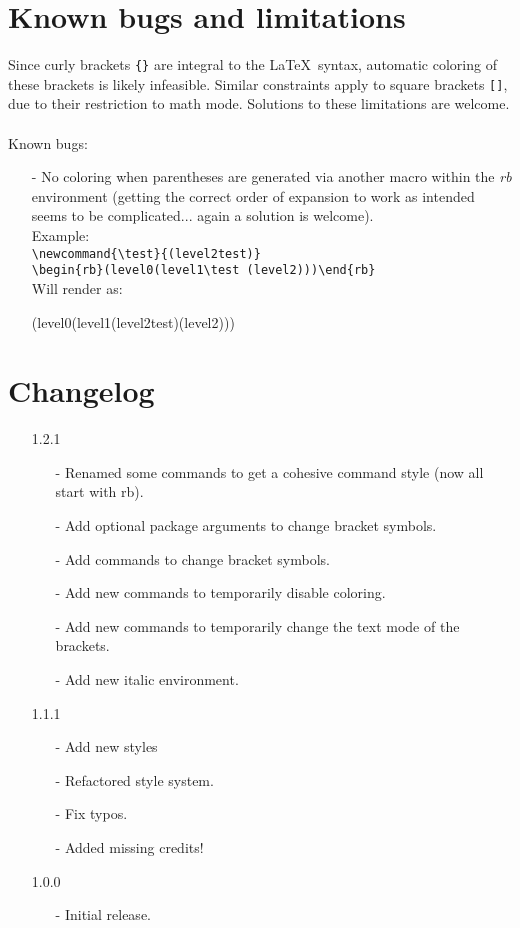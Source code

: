 \documentclass[10pt, a4paper]{article}
\begin{document}
	\section{Known bugs and limitations}
	Since curly brackets \verb={}= are integral to the \LaTeX\ syntax, automatic coloring of these brackets is likely infeasible. Similar constraints apply to square brackets \verb=[]=, due to their restriction to math mode. Solutions to these limitations are welcome.
	\\\ \\Known bugs:
	\begin{enumerate}
		\item[-] No coloring when parentheses are generated via another macro within the \textit{rb} environment (getting the correct order of expansion to work as intended seems to be complicated... again a solution is welcome). \\Example: 
		\\\verb=\newcommand{\test}{(level2test)}= 
		\\\verb=\begin{rb}(level0(level1\test (level2)))\end{rb}= 
		\\Will render as: \newcommand{\test}{(level2test)}
		\begin{rb}(level0(level1\test (level2)))\end{rb}  
	\end{enumerate}
	\section{Changelog}
	\begin{itemize}
		\item[1.2.1] 
		\begin{enumerate}
			\item[-] Renamed some commands to get a cohesive command style (now all start with rb).
			\item[-] Add optional package arguments to change bracket symbols.
			\item[-] Add commands to change bracket symbols.
			\item[-] Add new commands to temporarily disable coloring.
			\item[-] Add new commands to temporarily change the text mode of the brackets.
			\item[-] Add new italic environment.
		\end{enumerate}
		\item[1.1.1] 
		\begin{enumerate}
			\item[-] Add new styles
			\item[-] Refactored style system.
			\item[-] Fix typos.
			\item[-] Added missing credits!
		\end{enumerate}
		\item[1.0.0] 
		\begin{enumerate}
			\item[-] Initial release.
		\end{enumerate}
	\end{itemize}
\end{document}
